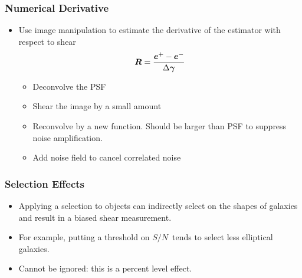 \documentclass{beamer}
\newcommand{\mcalR}{\mbox{\boldmath $R$}}
\newcommand{\vecg}{\mbox{\boldmath $\gamma$}}
\newcommand{\vest}{\mbox{\boldmath $e$}}
\newcommand{\snr}{$S/N$}
\begin{document}
\frame
{
 
    \frametitle{Numerical Derivative}

       \begin{itemize}

        \item Use image manipulation to estimate the derivative of the
            estimator with respect to shear
            {\color{gold}
                \begin{equation}
                    \mcalR = \frac{\vest^+ - \vest^-}{\Delta \vecg} \nonumber 
                \end{equation}
            }
            \begin{itemize}
                \item Deconvolve the PSF
                \item Shear the image by a small amount
                \item Reconvolve by a new function.  Should be larger than PSF to suppress
                    noise amplification. 
                \item {\color{lightsteelblue} Add noise field to cancel correlated noise}
            \end{itemize}


    \end{itemize}

}


\frame
{
    \frametitle{Selection Effects}

 

    \begin{itemize}

        \item  Applying a selection to objects can indirectly select on the shapes
            of galaxies and result in a biased shear measurement.

        \item For example, putting a threshold on \snr\ tends to select less
            elliptical galaxies.

        \item Cannot be ignored: this is a percent level effect.

    \end{itemize}

}
\end{document}

